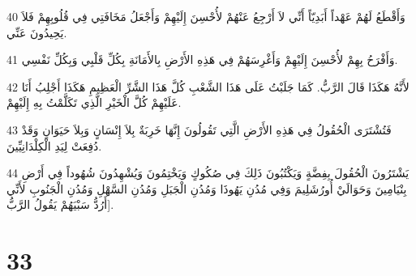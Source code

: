 \par 40 وَأَقْطَعُ لَهُمْ عَهْداً أَبَدِيّاً أَنِّي لاَ أَرْجِعُ عَنْهُمْ لأُحْسِنَ إِلَيْهِمْ وَأَجْعَلُ مَخَافَتِي فِي قُلُوبِهِمْ فَلاَ يَحِيدُونَ عَنِّي.
\par 41 وَأَفْرَحُ بِهِمْ لأُحْسِنَ إِلَيْهِمْ وَأَغْرِسَهُمْ فِي هَذِهِ الأَرْضِ بِالأَمَانَةِ بِكُلِّ قَلْبِي وَبِكُلِّ نَفْسِي.
\par 42 لأَنَّهُ هَكَذَا قَالَ الرَّبُّ. كَمَا جَلَبْتُ عَلَى هَذَا الشَّعْبِ كُلَّ هَذَا الشَّرِّ الْعَظِيمِ هَكَذَا أَجْلِبُ أَنَا عَلَيْهِمْ كُلَّ الْخَيْرِ الَّذِي تَكَلَّمْتُ بِهِ إِلَيْهِمْ.
\par 43 فَتُشْتَرَى الْحُقُولُ فِي هَذِهِ الأَرْضِ الَّتِي تَقُولُونَ إِنَّهَا خَرِبَةٌ بِلاَ إِنْسَانٍ وَبِلاَ حَيَوَانٍ وَقَدْ دُفِعَتْ لِيَدِ الْكِلْدَانِيِّينَ.
\par 44 يَشْتَرُونَ الْحُقُولَ بِفِضَّةٍ وَيَكْتُبُونَ ذَلِكَ فِي صُكُوكٍ وَيَخْتِمُونَ وَيُشْهِدُونَ شُهُوداً فِي أَرْضِ بِنْيَامِينَ وَحَوَالَيْ أُورُشَلِيمَ وَفِي مُدُنِ يَهُوذَا وَمُدُنِ الْجَبَلِ وَمُدُنِ السَّهْلِ وَمُدُنِ الْجَنُوبِ لأَنِّي أَرُدُّ سَبْيَهُمْ يَقُولُ الرَّبُّ].

\chapter{33}

